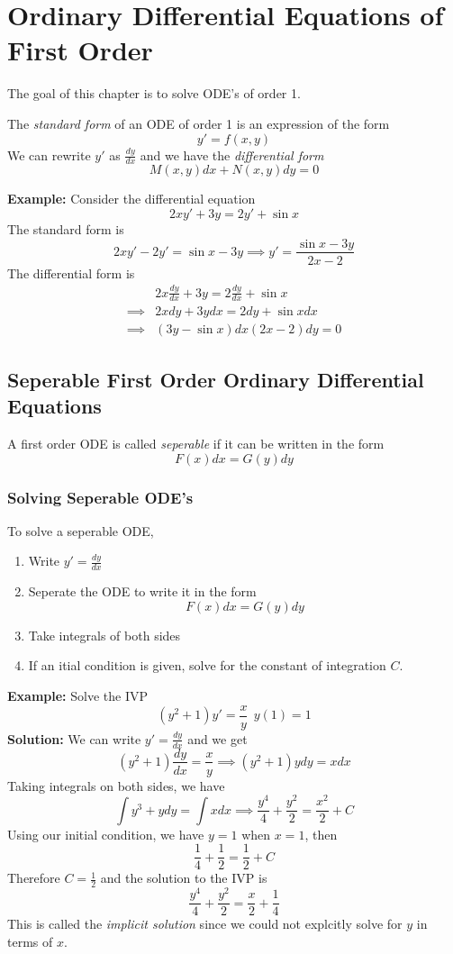 \documentclass[openany]{report}
\begin{document}
\chapter{Ordinary Differential Equations of First Order}
The goal of this chapter is to solve ODE's of order 1. 
\begin{definition}
    The \emph{standard form} of an ODE of order 1 is an expression of the form 
    \[y' = f(x,y)\]
    We can rewrite $y'$ as $\frac{dy}{dx}$ and we have the \emph{differential form} 
    \[M(x,y)dx + N(x,y)dy = 0\]
\end{definition}
\noindent
\textbf{Example:} Consider the differential equation 
\[2xy' + 3y = 2y' + \sin x\]
The standard form is
\[2xy ' - 2y' = \sin x - 3y \implies y' = \frac{\sin x - 3y}{2x-2}\]
The differential form is 
\begin{align*}
    &2x\frac{dy}{dx} + 3y = 2\frac{dy}{dx} + \sin x   \\
    \implies&2xdy + 3ydx = 2dy + \sin x dx\\
    \implies& (3y - \sin x)dx (2x-2)dy = 0
\end{align*}
\section{Seperable First Order Ordinary Differential Equations}

\begin{definition}
    A first order ODE is called \emph{seperable} if it can be written in the form
    \[F(x)dx = G(y)dy\]
\end{definition}
\subsection{Solving Seperable ODE's} 
To solve a seperable ODE,
\begin{enumerate}
    \item Write $y' = \frac{dy}{dx}$
    \item Seperate the ODE to write it in the form 
    \[F(x)dx = G(y)dy\]
    \item Take integrals of both sides
    \item If an itial condition is given, solve for the constant of integration $C$. 
\end{enumerate}
\textbf{Example:} Solve the IVP 
\[(y^2 + 1)y' = \frac{x}{y} \ \ y(1) = 1\]
\textbf{Solution:} We can write $y' = \frac{dy}{dx}$ and we get 
    \[(y^2 + 1)\frac{dy}{dx} = \frac{x}{y} \implies (y^2 + 1)ydy = xdx\]
    Taking integrals on both sides, we have 
    \[\int y^3 + ydy = \int xdx \implies \frac{y^4}{4} + \frac{y^2}{2} = \frac{x^2}{2} + C\]
    Using our initial condition, we have $y = 1$ when $x =1$, then 
    \[\frac{1}{4} + \frac{1}{2} = \frac{1}{2} + C\]
    Therefore $C = \frac{1}{2}$ and the solution to the IVP is
    \[\frac{y^4}{4} + \frac{y^2}{2} = \frac{x}{2} + \frac{1}{4}\]
    This is called the \emph{implicit solution} since we could not explcitly solve for $y$ in terms of $x$. \\[2ex]
\end{document}
